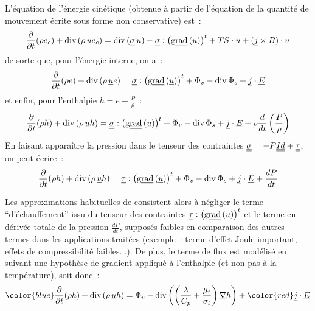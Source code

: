 L'\'equation de l'\'energie
cin\'etique (obtenue \`a partir de l'\'equation de la quantit\'e de mouvement
\'ecrite sous forme non conservative) est~:
\begin{equation}
\displaystyle\frac{\partial}{\partial t}(\rho e_c)
+\text{div}\,(\rho\, \underline{u} e_c)
=\text{div}\,(\underline{\underline{\sigma}}\,\underline{u}) - \underline{\underline{\sigma}}:\left(\text{g}\underline{\underline{{\text{rad}}}}\,(\underline{u})\right)^t +
\underline{TS}\cdot\underline{u} + (\underline{j} \times \underline{B})\cdot\underline{u}
\end{equation}
de sorte que, pour l'\'energie interne, on a~:
\begin{equation}
\displaystyle\frac{\partial}{\partial t}(\rho e)
+\text{div}\,(\rho\, \underline{u} e)
=\underline{\underline{\sigma}}:\left(\text{g}\underline{\underline{{\text{rad}}}}\,(\underline{u})\right)^t + \Phi_v - \text{div}\,{\Phi_s} + \underline{j}\cdot \underline{E}
\end{equation}
et enfin, pour l'enthalpie $h=e+\frac{P}{\rho}$~:
\begin{equation}
\displaystyle\frac{\partial}{\partial t}(\rho h)
+\text{div}\,(\rho\, \underline{u} h)
=\underline{\underline{\sigma}}:\left(\text{g}\underline{\underline{{\text{rad}}}}\,(\underline{u})\right)^t + \Phi_v - \text{div}\,{\Phi_s} + \underline{j}\cdot \underline{E}+\rho\frac{d}{dt}\left(\frac{P}{\rho}\right)
\end{equation}
En faisant appara\^itre la pression dans le tenseur des contraintes
$\underline{\underline{\sigma}}=-P\underline{\underline{Id}}+\underline{\underline{\tau}}$, on peut \'ecrire~:
\begin{equation}
\displaystyle\frac{\partial}{\partial t}(\rho h)
+\text{div}\,(\rho\, \underline{u} h)
=\underline{\underline{\tau}}:\left(\text{g}\underline{\underline{{\text{rad}}}}\,(\underline{u})\right)^t + \Phi_v - \text{div}\,{\Phi_s}
+ \underline{j}\cdot\underline{E} + \frac{dP}{dt}
\end{equation}

Les approximations habituelles de \CS consistent alors
\`a n\'egliger le terme ``d'\'echauffement'' issu du tenseur des contraintes
$\underline{\underline{\tau}}:\left(\text{g}\underline{\underline{{\text{rad}}}}\,(\underline{u})\right)^t$ et le terme en d\'eriv\'ee totale de la
pression $\frac{dP}{dt}$, suppos\'es faibles en comparaison des autres termes
dans les applications trait\'ees (exemple~: terme d'effet Joule important, effets de
compressibilit\'e faibles...).
De plus, le terme de flux est mod\'elis\'e en suivant
une hypoth\`ese de gradient appliqu\'e \`a l'enthalpie (et non pas \`a la
temp\'erature), soit donc~:
\begin{equation}
{\color{blue}\displaystyle\frac{\partial}{\partial t}(\rho h)
+\dive(\rho\, \vect{u} h)
=\Phi_v -
\dive{\left(\left(\frac{\lambda}{C_p}+\frac{\mu_t}{\sigma_t}\right)\grad h\right)} + {\color{red}\vect{j}\cdot\vect{E}}}
\end{equation}


